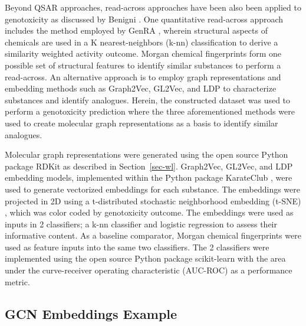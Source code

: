 \documentclass[
  super,
  preprint,
  3p]{elsarticle}
\begin{document}
Beyond QSAR approaches, read-across approaches have been also been
applied to genotoxicity as discussed by Benigni
\citep{benigni_towards_2019}. One quantitative read-across approach
includes the method employed by GenRA \citep{shah_systematically_2016},
wherein structural aspects of chemicals are used in a K
nearest-neighbors (k-nn) classification to derive a similarity weighted
activity outcome. Morgan chemical fingerprints form one possible set of
structural features to identify similar substances to perform a
read-across. An alternative approach is to employ graph representations
and embedding methods such as Graph2Vec, GL2Vec, and LDP to characterize
substances and identify analogues. Herein, the constructed dataset was
used to perform a genotoxicity prediction where the three aforementioned
methods were used to create molecular graph representations as a basis
to identify similar analogues.

Molecular graph representations were generated using the open source
Python package RDKit as described in Section~\ref{sec-wl}. Graph2Vec,
GL2Vec, and LDP embedding models, implemented within the Python package
KarateClub \citep{karateclub}, were used to generate vectorized
embeddings for each substance. The embeddings were projected in 2D using
a t-distributed stochastic neighborhood embedding (t-SNE)
\citep{van_er_maaten_visualizing_2018}, which was color coded by
genotoxicity outcome. The embeddings were used as inputs in 2
classifiers; a k-nn classifier and logistic regression to assess their
informative content. As a baseline comparator, Morgan chemical
fingerprints were used as feature inputs into the same two classifiers.
The 2 classifiers were implemented using the open source Python package
scikit-learn \citep{RN53} with the area under the curve-receiver
operating characteristic (AUC-ROC) as a performance metric.

\subsection{GCN Embeddings Example}\label{gcn-embeddings-example}
\end{document}

